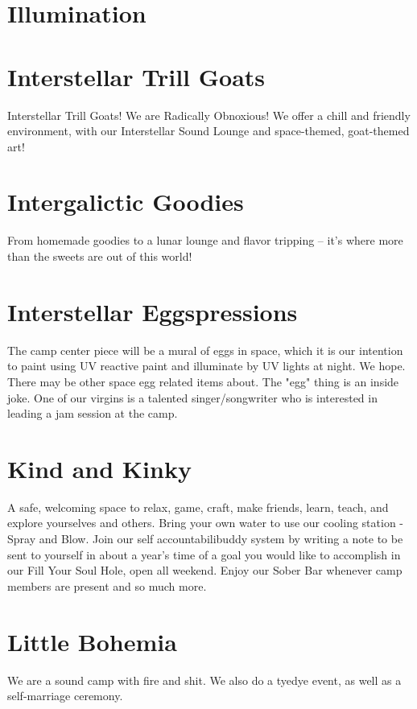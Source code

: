 \section*{Illumination}
 


\section*{Interstellar Trill Goats}
Interstellar Trill Goats! We are Radically Obnoxious! We offer a chill and friendly environment, with our Interstellar Sound Lounge and space-themed, goat-themed art! 


\section*{Intergalictic Goodies}
From homemade goodies to a lunar lounge and flavor tripping -- it's where more than the sweets are out of this world! 


\section*{Interstellar Eggspressions}
The camp center piece will be a mural of eggs in space, which it is our intention to paint using UV reactive paint and illuminate by UV lights at night. We hope. There may be other space egg related items about. The "egg" thing is an inside joke.  One of our virgins is a talented singer/songwriter who is interested in leading a jam session at the camp. 


\section*{Kind and Kinky}
A safe, welcoming space to relax, game, craft, make friends, learn, teach, and explore yourselves and others. Bring your own water to use our cooling station - Spray and Blow. Join our self accountabilibuddy system by writing a note to be sent to yourself in about a year’s time of a goal you would like to accomplish in our Fill Your Soul Hole, open all weekend. Enjoy our Sober Bar whenever camp members are present and so much more. 


\section*{Little Bohemia}
We are a sound camp with fire and shit. We also do a tyedye event, as well as a self-marriage ceremony. 


